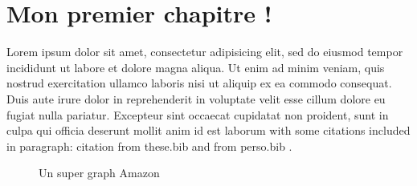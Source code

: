 \chapter{Mon premier chapitre !}
\minitoc\mtcskip

Lorem ipsum dolor sit amet, consectetur adipisicing elit, sed do eiusmod tempor
incididunt ut labore et dolore magna aliqua. Ut enim ad minim veniam, quis
nostrud exercitation ullamco laboris nisi ut aliquip ex ea commodo consequat.
Duis aute irure dolor in reprehenderit in voluptate velit esse cillum dolore eu
fugiat nulla pariatur. Excepteur sint occaecat cupidatat non proident, sunt in
culpa qui officia deserunt mollit anim id est laborum with some citations included 
in paragraph: citation from these.bib \cite{Boccaletti2006} and from perso.bib .

%
%
\begin{figure}
	\centering
	\caption{Un super graph Amazon}
\end{figure}

%
%
